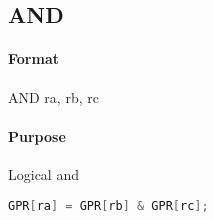 \subsection{AND}


\paragraph{Format} AND ra, rb, rc

\paragraph{Purpose} Logical and

\begin{lstlisting}[language=c]
    GPR[ra] = GPR[rb] & GPR[rc];
\end{lstlisting}

